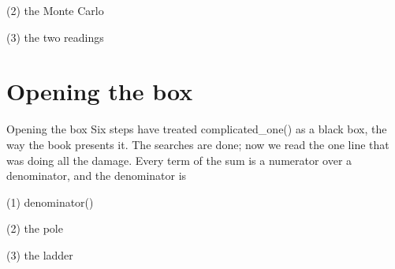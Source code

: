\begin{frame}[fragile]{(2) the Monte Carlo}

\end{frame}

\begin{frame}[fragile]{(3) the two readings}

\end{frame}


\section{Opening the box}

\begin{frame}{Opening the box}
Six steps have treated complicated\_one() as a black box, the way the book
presents it. The searches are done; now we read the one line that was doing
all the damage. Every term of the sum is a numerator over a denominator, and
the denominator is
\end{frame}

\begin{frame}[fragile]{(1) denominator()}

\end{frame}

\begin{frame}[fragile]{(2) the pole}

\end{frame}

\begin{frame}[fragile]{(3) the ladder}

\end{frame}



